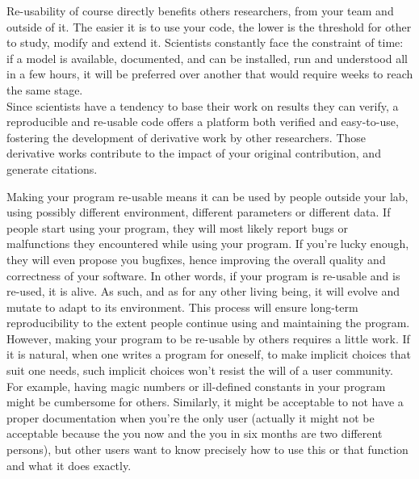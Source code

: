 \documentclass[a4paper,11pt]{article}
\begin{document}
Re-usability of course directly benefits others researchers, from your team and outside of it. The easier it is to use your code, the lower is the threshold for other to study, modify and extend it. Scientists constantly face the constraint of time: if a model is available, documented, and can be installed, run and understood all in a few hours, it will be preferred over another that would require weeks to reach the same stage.\\

Since scientists have a tendency to base their work on results they can verify, a reproducible and re-usable code offers a platform both verified and easy-to-use, fostering the development of derivative work by other researchers. Those derivative works contribute to the impact of your original contribution, and generate citations. 


% 
% 


Making your program re-usable means it can be used by people outside your lab,
using possibly different environment, different parameters or different data.
If people start using your program, they will most likely report bugs or malfunctions they encountered while using your program.
If you're lucky enough, they will even propose you bugfixes, hence improving the overall quality and correctness of your software.
In other words, if your program is re-usable and is re-used, it is alive.
As such, and as for any other living being, it will evolve and mutate to adapt to its environment.
This process will ensure long-term reproducibility to the extent people continue using and maintaining the program.\\

However, making your program to be re-usable by others requires a little work. If it is natural, when one writes a program for oneself, to make implicit choices that suit one needs, such implicit choices won't resist the will of a user community. For example, having magic numbers or ill-defined constants in your program might be cumbersome for others. Similarly, it might be acceptable to not have a proper documentation when you're the only user (actually it might not be acceptable because the you now and the you in six months are two different persons), but other users want to know precisely how to use this or that function and what it does exactly.\\
\end{document}
